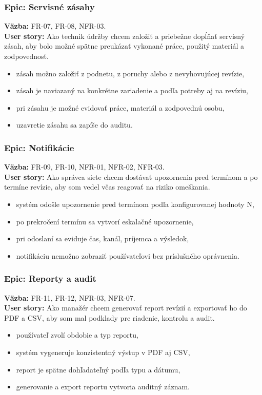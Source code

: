 \subsubsection*{Epic: Servisné zásahy}
\textbf{Väzba:} FR-07, FR-08, NFR-03.\\
\textbf{User story:} Ako technik údržby chcem založiť a priebežne dopĺňať servisný zásah, aby bolo možné spätne preukázať vykonané práce, použitý materiál a zodpovednosť.
\begin{itemize}
\item zásah možno založiť z podnetu, z poruchy alebo z nevyhovujúcej revízie,
\item zásah je naviazaný na konkrétne zariadenie a podľa potreby aj na revíziu,
\item pri zásahu je možné evidovať práce, materiál a zodpovednú osobu,
\item uzavretie zásahu sa zapíše do auditu.
\end{itemize}

\subsubsection*{Epic: Notifikácie}
\textbf{Väzba:} FR-09, FR-10, NFR-01, NFR-02, NFR-03.\\
\textbf{User story:} Ako správca siete chcem dostávať upozornenia pred termínom a po termíne revízie, aby som vedel včas reagovať na riziko omeškania.
\begin{itemize}
\item systém odošle upozornenie pred termínom podľa konfigurovanej hodnoty N,
\item po prekročení termínu sa vytvorí eskalačné upozornenie,
\item pri odoslaní sa eviduje čas, kanál, príjemca a výsledok,
\item notifikáciu nemožno zobraziť používateľovi bez príslušného oprávnenia.
\end{itemize}

\subsubsection*{Epic: Reporty a audit}
\textbf{Väzba:} FR-11, FR-12, NFR-03, NFR-07.\\
\textbf{User story:} Ako manažér chcem generovať report revízií a exportovať ho do PDF a CSV, aby som mal podklady pre riadenie, kontrolu a audit.
\begin{itemize}
\item používateľ zvolí obdobie a typ reportu,
\item systém vygeneruje konzistentný výstup v PDF aj CSV,
\item report je spätne dohľadateľný podľa typu a dátumu,
\item generovanie a export reportu vytvoria auditný záznam.
\end{itemize}

